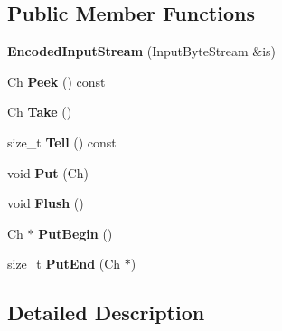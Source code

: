 \subsection*{Public Member Functions}
\begin{DoxyCompactItemize}
\item 
{\bfseries Encoded\+Input\+Stream} (Input\+Byte\+Stream \&is)\hypertarget{class_encoded_input_stream_a17f8e629500f6ae71cb72d1d63bf41fd}{}\label{class_encoded_input_stream_a17f8e629500f6ae71cb72d1d63bf41fd}

\item 
Ch {\bfseries Peek} () const \hypertarget{class_encoded_input_stream_abda3b0c141254343f4c481f67d52b423}{}\label{class_encoded_input_stream_abda3b0c141254343f4c481f67d52b423}

\item 
Ch {\bfseries Take} ()\hypertarget{class_encoded_input_stream_ab42cd57581bf62e42af471583e5b8377}{}\label{class_encoded_input_stream_ab42cd57581bf62e42af471583e5b8377}

\item 
size\+\_\+t {\bfseries Tell} () const \hypertarget{class_encoded_input_stream_a34cdb99fd81cd211f71903348e9c986f}{}\label{class_encoded_input_stream_a34cdb99fd81cd211f71903348e9c986f}

\item 
void {\bfseries Put} (Ch)\hypertarget{class_encoded_input_stream_afea36b666a44bd4adeabfcab7b68a322}{}\label{class_encoded_input_stream_afea36b666a44bd4adeabfcab7b68a322}

\item 
void {\bfseries Flush} ()\hypertarget{class_encoded_input_stream_aa4415bf4b97dd01e8c3de0ad7a161724}{}\label{class_encoded_input_stream_aa4415bf4b97dd01e8c3de0ad7a161724}

\item 
Ch $\ast$ {\bfseries Put\+Begin} ()\hypertarget{class_encoded_input_stream_ad97f7a549a8622c61b7fb2c63fedd69b}{}\label{class_encoded_input_stream_ad97f7a549a8622c61b7fb2c63fedd69b}

\item 
size\+\_\+t {\bfseries Put\+End} (Ch $\ast$)\hypertarget{class_encoded_input_stream_a83fe5ed281413d6005d1b324730e8bed}{}\label{class_encoded_input_stream_a83fe5ed281413d6005d1b324730e8bed}

\end{DoxyCompactItemize}


\subsection{Detailed Description}
